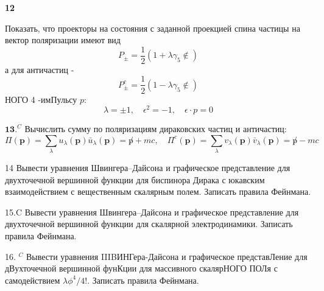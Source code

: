 \documentclass[a4paper,12pt]{article} %
\begin{document}
\begin{ttask} \textbf{12} 

Показать, что проекторы на состояния с заданной проекцией
спина частицы на вектор поляризации имеют вид
$$
P_{\pm}=\frac{1}{2}\left(1+\lambda \gamma_{5} \notin\right)
$$
а для античастиц -
$$
P_{\pm}^{c}=\frac{1}{2}\left(1-\lambda \gamma_{5} \notin\right)
$$
НОГО 4 -имПульсу $p:$
$$
\lambda=\pm 1, \quad \epsilon^{2}=-1, \quad \epsilon \cdot p=0
$$


\end{ttask}



\begin{ttask}


$\mathbf{1 3 .}^{C}$ Вычислить сумму по поляризациям дираковских частиц и античастиц:
$$
\Pi(\boldsymbol{p})=\sum_{\lambda} u_{\lambda}(\boldsymbol{p}) \bar{u}_{\lambda}(\boldsymbol{p})=\not p+m c, \quad \Pi^{c}(\boldsymbol{p})=\sum_{\lambda} v_{\lambda}(\boldsymbol{p}) \bar{v}_{\lambda}(\boldsymbol{p})=\not p-m c
$$


\end{ttask}






\begin{ttask}

14 Вывести уравнения Швингера–Дайсона и графическое представление для двухточечной вершинной функции для биспинора Дирака с юкавским взаимодействием с вещественным скалярным полем. Записать правила Фейнмана.


\end{ttask}



\begin{ttask}

15.C Вывести уравнения Швингера–Дайсона и графическое представление для двухточечной вершинной функции для скалярной электродинамики. Записать правила Фейнмана. 



\end{ttask}



\begin{ttask}

16. $^{C}$ Вывести уравнения IIIBИНГера-Дайсона и графическое представЛение для дВухточечной вершинной фунКции для массивного скалярНОГО ПОЛя с самодействием $\lambda \phi^{4} / 4 ! .$ Записать правила Фейнмана.


\end{ttask}
\end{document}
